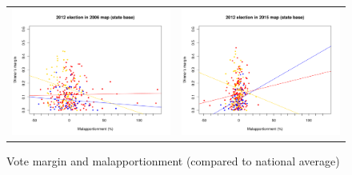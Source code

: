 \documentclass[letter,12pt]{article}
\begin{document}
\begin{figure}
\begin{center}
\begin{tabular}{cc}
    \includegraphics[width=.4\columnwidth]{../graphs/malmg2012d0nat.pdf} & \includegraphics[width=.4\columnwidth]{../graphs/malmg2012d3nat.pdf} \\
  \end{tabular}
  \caption{Vote margin and malapportionment (compared to national average)}\label{F:malmgnat}
\end{center}
\end{figure}
\end{document}
